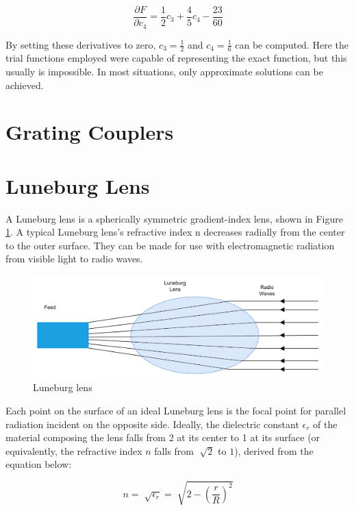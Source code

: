 \documentclass[a4paper,12pt]{report}
\begin{document}
\begin{equation}
  \frac{\partial F}{\partial c_4} = \frac{1}{2}c_3 + \frac{4}{5} c_4 - \frac{23}{60}
\end{equation}

By setting these derivatives to zero,
$c_3 = \frac{1}{2}$ and $c_4 = \frac{1}{6}$ can be computed.
Here the trial functions employed were capable of representing
the exact function, but this usually is impossible.
In most situations, only approximate solutions can be achieved.


\section{Grating Couplers}


\section{Luneburg Lens}


A Luneburg lens is a spherically symmetric gradient-index lens,
shown in Figure \ref{fig:luneburg_lens}.
A typical Luneburg lens's refractive index n decreases radially
from the center to the outer surface.
They can be made for use with electromagnetic radiation
from visible light to radio waves.

\begin{figure}
  \begin{center}
    \includegraphics[clip, keepaspectratio, width=0.5\linewidth]{img/luneburg_lens.png}
    \caption{Luneburg lens}
    \label{fig:luneburg_lens}
  \end{center}
\end{figure}

Each point on the surface of an ideal Luneburg lens is the
focal point for parallel radiation incident on the opposite side.
Ideally, the dielectric constant $\epsilon_r$ of the material
composing the lens falls from 2 at its center to 1 at its surface
(or equivalently, the refractive index $n$ falls from $\sqrt[]{2}$ to $1$),
derived from the equation below:

\begin{equation}
  n = \sqrt[]{\epsilon_r} = \sqrt[]{2 - \left(\frac{r}{R}\right)^2}
\end{equation}
\end{document}

